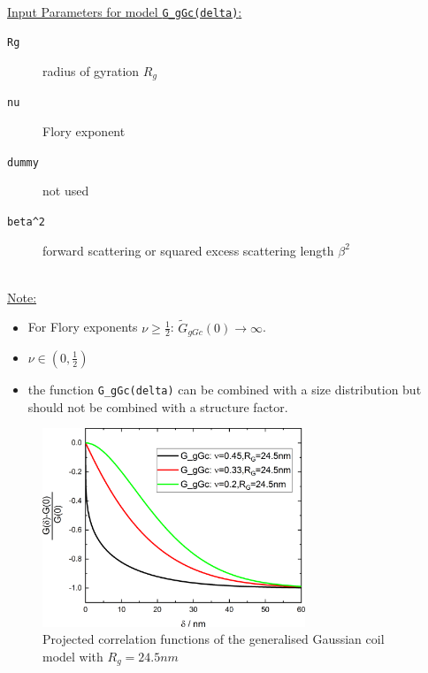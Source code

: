 \hspace{1pt}\\
\underline{Input Parameters for model \texttt{G\_gGc(delta)}:}\\
\begin{description}
\item[\texttt{Rg}] radius of gyration $R_g$
\item[\texttt{nu}] Flory exponent
\item[\texttt{dummy}] not used
\item[\texttt{beta\^{}2}] forward scattering or squared excess scattering length $\beta^2$
\end{description}

\hspace{1pt}\\
\underline{Note:}
\begin{itemize}
\item For Flory exponents $\nu\geq \frac12$: $\tilde{G}_{gGc}(0) \rightarrow \infty$.
\item $\nu\in \left(0,\frac12\right)$
\item the function \texttt{G\_gGc(delta)} can be combined with a size distribution but should not be combined with a structure factor.
\end{itemize}

\begin{figure}[htb]
\begin{center}
\includegraphics[width=0.7\textwidth]{../images/form_factor/SESANS/G_gGc.png}
\end{center}
\caption{Projected correlation functions of the generalised Gaussian coil model with $R_g=24.5nm$}
\label{fig:G_gDAB}
\end{figure}